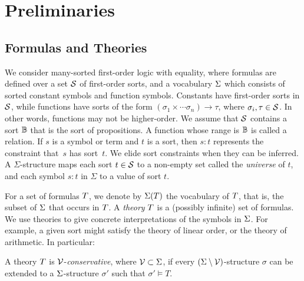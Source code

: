 \section{Preliminaries}
\label{sec:prelim}

\subsection{Formulas and Theories}
We consider many-sorted first-order logic with equality, where formulas are defined over a set $\mathcal{S}$ of first-order sorts, and a vocabulary ${\Sigma}$ which consists of sorted constant symbols and function symbols.
Constants have first-order sorts in $\mathcal{S}$, while functions have sorts of the form $(\sigma_1\times\cdots\sigma_n) \rightarrow \tau$, where $\sigma_i,\tau \in \mathcal{S}$. In other words, functions may not be higher-order.
We assume that $\mathcal{S}$ contains a sort $\mathbb{B}$ that is the sort of propositions. A function whose range is $\mathbb{B}$ is called a relation. If $s$ is a symbol or term and $t$ is a sort, then $s:t$ represents the constraint that~$s$ has sort~$t$. We elide sort constraints when they can be inferred. A $\Sigma$-structure maps
each sort $t\in\mathcal{S}$ to a non-empty set called the \emph{universe} of $t$, and each symbol $s:t$ in $\Sigma$ to a value of sort $t$.

For a set of formulas $T$, we denote by ${\Sigma}(T)$ the vocabulary of $T$, that is, the subset of ${\Sigma}$ that occurs in $T$.
A \emph{theory} $T$ is a (possibly infinite) set of formulas. %
We use theories to give concrete interpretations of the symbols in ${\Sigma}$.
For example, a given sort might satisfy the theory of linear order, or the theory of
arithmetic.
In particular:

\begin{definition}
  \label{def:conservative}
  A theory $T$ is $\mathcal{V}$-\emph{conservative}, where $\mathcal{V} \subset {\ensuremath{\Sigma}}$, if every
  $({\Sigma} \setminus \mathcal{V})$-structure $\sigma$ can be extended to a ${\Sigma}$-structure
  $\sigma'$ such that $\sigma' \models T$.
\end{definition}

